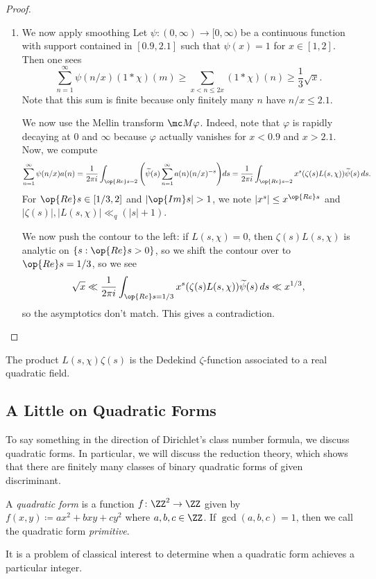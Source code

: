 \documentclass[../notes.tex]{subfiles}
\begin{document}
\begin{proof}
\begin{enumerate}
		\item We now apply smoothing Let $\psi\colon(0,\infty)\to[0,\infty)$ be a continuous function with support contained in $[0.9,2.1]$ such that $\psi(x)=1$ for $x\in[1,2]$. Then one sees
		\[\sum_{n=1}^\infty\psi(n/x)(1*\chi)(m)\ge\sum_{x<n\le2x}(1*\chi)(n)\ge\frac13\sqrt x.\]
		Note that this sum is finite because only finitely many $n$ have $n/x\le2.1$.
	
		We now use the Mellin transform $\mc M\varphi$. Indeed, note that $\varphi$ is rapidly decaying at $0$ and $\infty$ because $\varphi$ actually vanishes for $x<0.9$ and $x>2.1$. Now, we compute
		\[\sum_{n=1}^\infty\psi(n/x)a(n)=\frac1{2\pi i}\int_{\op{Re}s=2}\Bigg(\widetilde\psi(s)\sum_{n=1}^\infty a(n)(n/x)^{-s}\Bigg)ds=\frac1{2\pi i}\int_{\op{Re}s=2}x^s(\zeta(s)L(s,\chi))\widetilde\psi(s)\,ds.\]
		For $\op{Re}s\in[1/3,2]$ and $|\op{Im}s|>1$, we note $|x^s|\le x^{\op{Re}s}$ and $|\zeta(s)|,|L(s,\chi)|\ll_q(|s|+1)$.
	
		We now push the contour to the left: if $L(s,\chi)=0$, then $\zeta(s)L(s,\chi)$ is analytic on $\{s:\op{Re}s>0\}$, so we shift the contour over to $\op{Re}s=1/3$, so we see
		\[\sqrt x\ll\frac1{2\pi i}\int_{\op{Re}s=1/3}x^s(\zeta(s)L(s,\chi))\widetilde\psi(s)\,ds\ll x^{1/3},\]
		so the asymptotics don't match. This gives a contradiction.
		\qedhere
	\end{enumerate}
\end{proof}
\begin{remark}
	The product $L(s,\chi)\zeta(s)$ is the Dedekind $\zeta$-function associated to a real quadratic field.
\end{remark}

\subsection{A Little on Quadratic Forms}
To say something in the direction of Dirichlet's class number formula, we discuss quadratic forms. In particular, we will discuss the reduction theory, which shows that there are finitely many classes of binary quadratic forms of given discriminant.
\begin{definition}
	A \textit{quadratic form} is a function $f\colon\ZZ^2\to\ZZ$ given by $f(x,y)\coloneqq ax^2+bxy+cy^2$ where $a,b,c\in\ZZ$. If $\gcd(a,b,c)=1$, then we call the quadratic form \textit{primitive}.
\end{definition}
It is a problem of classical interest to determine when a quadratic form achieves a particular integer.
\end{document}
